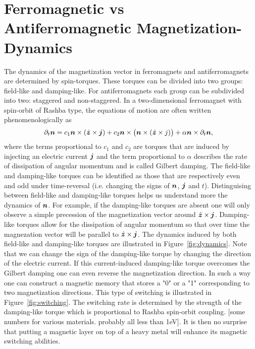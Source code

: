 \section{Ferromagnetic vs Antiferromagnetic Magnetization-Dynamics}
The dynamics of the magnetization vector in ferromagnets and antiferromagnets are determined by spin-torques. These torques can be divided into two groups: field-like and damping-like. For antiferromagnets each group can be subdivided into two: staggered and non-staggered. In a two-dimensional ferromagnet with spin-orbit of Rashba type, the equations of motion are often written phenomenologically as
\begin{equation}
    \partial_t \boldsymbol{n} = c_1 \boldsymbol{n}\times (\hat{\boldsymbol{z}}\times\boldsymbol{j}) + c_2 \boldsymbol{n}\times\big(\boldsymbol{n}\times (\hat{\boldsymbol{z}}\times{j})\big) + \alpha \boldsymbol{n}\times \partial_t \boldsymbol{n},
\end{equation}
where the terms proportional to $c_1$ and $c_2$ are torques that are induced by injecting an electric current $\boldsymbol{j}$ and the term proportional to $\alpha$ describes the rate of dissipation of angular momentum and is called Gilbert damping. The field-like and damping-like torques can be identified as those that are respectively even and odd under time-reversal (i.e. changing the signs of $\boldsymbol{n}$, $\boldsymbol{j}$ and $t$). Distinguising between field-like and damping-like torques helps us understand more the dynamics of $\boldsymbol{n}$. For example, if the damping-like torques are absent one will only observe a simple precession of the magnetization vector around $\hat{\boldsymbol{z}}\times\boldsymbol{j}$. Damping-like torques allow for the dissipation of angular momentum so that over time the magnezation vector will be parallel to $\hat{\boldsymbol{z}}\times\boldsymbol{j}$. The dynamics induced by both field-like and damping-like torques are illustrated in Figure~\ref{fig:dynamics}. Note that we can change the sign of the damping-like torque by changing the direction of the electric current. If this current-induced damping-like torque overcomes the Gilbert damping one can even reverse the magnetization direction. In such a way one can construct a magnetic memory that stores a "0" or a "1" corresponding to two magnetization directions. This type of switching is illustrated in Figure~\ref{fig:switching}. The switching rate is determined by the strength of the damping-like torque which is proportional to Rashba spin-orbit coupling. {\color{blue} [some numbers for various materials. probably all less than 1eV].} It is then no surprise that putting a magnetic layer on top of a heavy metal will enhance its magnetic switching abilities. 

